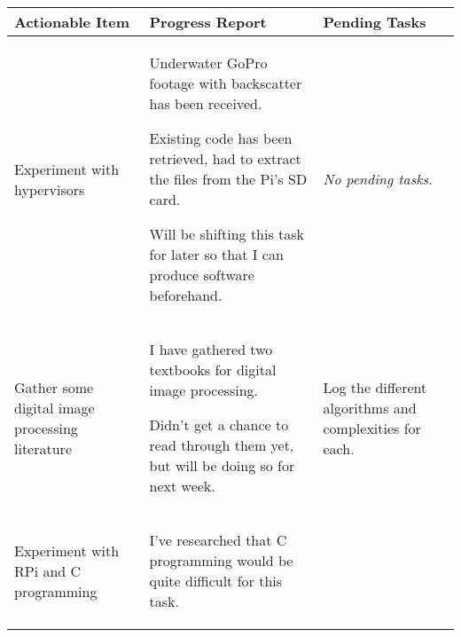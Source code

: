 \pagebreak
\begin{table}[!h]
    \centering
    \begin{tabularx}{\textwidth}{|X|X|X|}
        \hline
        Actionable Item & Progress Report & Pending Tasks \\
        \hline
        \hline
        \begin{myitemize}
            \item Experiment with hypervisors
        \end{myitemize} & 
        \begin{myitemize}
            \item Underwater GoPro footage with backscatter has been received.
            \item Existing code has been retrieved, had to extract the files from the Pi's SD card.
            \item Will be shifting this task for later so that I can produce software beforehand.
        \end{myitemize} & 
        \begin{myitemize}
            \item \textit{No pending tasks.}
        \end{myitemize} \\
        \hline
        \begin{myitemize}
            \item Gather some digital image processing literature
        \end{myitemize} & 
        \begin{myitemize}
            \item I have gathered two textbooks for digital image processing.
            \item Didn't get a chance to read through them yet, but will be doing so for next week.
        \end{myitemize} & 
        \begin{myitemize}
            \item Log the different algorithms and complexities for each.
        \end{myitemize} \\
        \hline
        \begin{myitemize}
            \item Experiment with RPi and C programming
        \end{myitemize} & 
        \begin{myitemize}
            \item I've researched that C programming would be quite difficult for this task.

\end{myitemize}
\end{tabularx}
\end{table}
